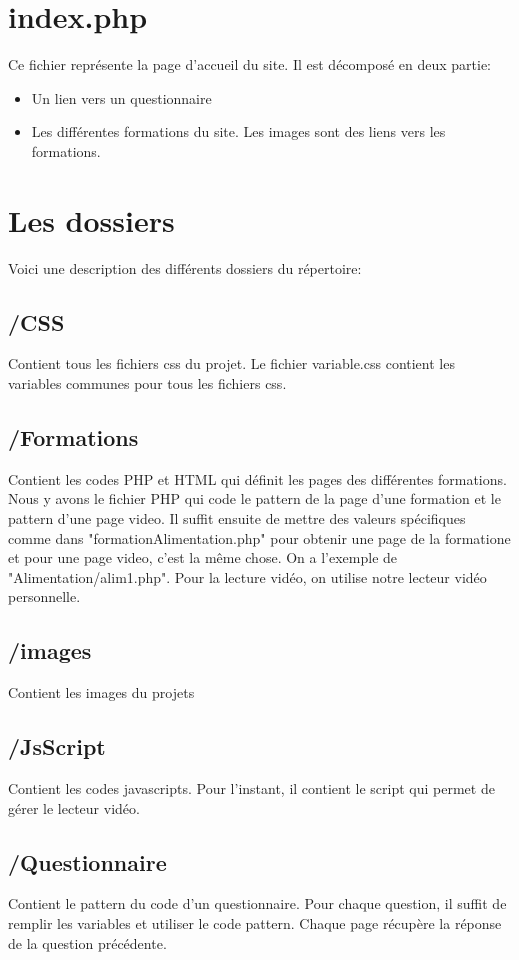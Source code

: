 \documentclass[a4paper]{article}
\begin{document}
\section{index.php}

Ce fichier représente la page d'accueil du site. Il est décomposé en deux partie:
	\begin{itemize}
		\item Un lien vers un questionnaire
		\item Les différentes formations du site. Les images sont des liens vers les formations.
	\end{itemize}

\section{Les dossiers}
Voici une description des différents dossiers du répertoire:

	\subsection{/CSS}
		Contient tous les fichiers css du projet. Le fichier variable.css contient les variables communes pour tous les fichiers css.
	
	\subsection{/Formations}
		 Contient les codes PHP et HTML qui définit les pages des différentes formations. Nous y avons le fichier PHP qui code le pattern de la page d'une formation et le pattern d'une page video. Il suffit ensuite de mettre des valeurs spécifiques comme dans "formationAlimentation.php" pour obtenir une page de la formatione et pour une page video, c'est la même chose. On a l'exemple de "Alimentation/alim1.php". Pour la lecture vidéo, on utilise notre lecteur vidéo personnelle.
	\subsection{/images}
		Contient les images du projets
		
	\subsection{/JsScript}
		Contient les codes javascripts. Pour l'instant, il contient le script qui permet de gérer le lecteur vidéo.
		
	\subsection{/Questionnaire}
		Contient le pattern du code d'un questionnaire. Pour chaque question, il suffit de remplir les variables et utiliser le code pattern. Chaque page récupère la réponse de la question précédente.
		
\end{document}
